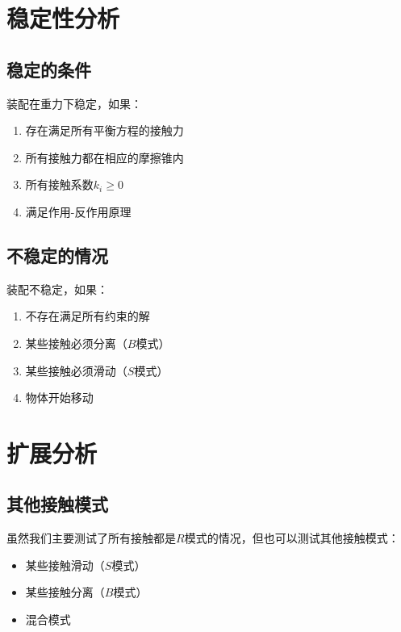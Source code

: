 \documentclass[12pt,a4paper]{article}
\begin{document}
\section{稳定性分析}

\subsection{稳定的条件}

装配在重力下稳定，如果：

\begin{enumerate}
    \item 存在满足所有平衡方程的接触力
    \item 所有接触力都在相应的摩擦锥内
    \item 所有接触系数$k_i \geq 0$
    \item 满足作用-反作用原理
\end{enumerate}

\subsection{不稳定的情况}

装配不稳定，如果：

\begin{enumerate}
    \item 不存在满足所有约束的解
    \item 某些接触必须分离（$B$模式）
    \item 某些接触必须滑动（$S$模式）
    \item 物体开始移动
\end{enumerate}

\section{扩展分析}

\subsection{其他接触模式}

虽然我们主要测试了所有接触都是$R$模式的情况，但也可以测试其他接触模式：

\begin{itemize}
    \item 某些接触滑动（$S$模式）
    \item 某些接触分离（$B$模式）
    \item 混合模式
\end{itemize}
\end{document}
